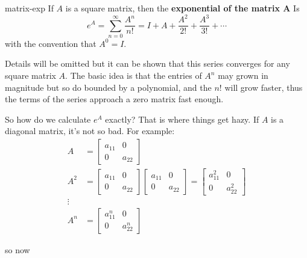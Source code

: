 \documentclass[letterpaper, 11pt, openany]{book}
\theoremstyle{mytheoremstyle}
\theoremstyle{myexamplestyle}
\begin{document}
\begin{definition}{}{matrix-exp}
    If \(A\) is a square matrix, then the \textbf{exponential of the matrix \(\bm{A}\)} Is
    \[e^{A} = \sum_{n=0}^{\infty} \frac{A^{n}}{n!} = I + A + \frac{A^{2}}{2!} + \frac{A^{3}}{3!} + \cdots\]
    with the convention that \(A^{0} = I\).
\end{definition}
Details will be omitted but it can be shown that this series converges for any square matrix \(A\). The basic idea is that the entries of \(A^{n}\) may grown in magnitude but so do bounded by a polynomial, and the \(n!\) will grow faster, thus the terms of the series approach a zero matrix fast enough.

So how do we calculate \(e^{A}\) exactly? That is where things get hazy. If \(A\) is a diagonal matrix, it's not so bad. For example:
\begin{align*}
    A &= \begin{bmatrix}
        a_{11} & 0\\
        0 & a_{22}
    \end{bmatrix} \\
    A^{2} &= \begin{bmatrix}
        a_{11} & 0\\
        0 & a_{22}
    \end{bmatrix}\begin{bmatrix}
        a_{11} & 0\\
        0 & a_{22}
    \end{bmatrix} =
    \begin{bmatrix}
        a_{11}^{2} & 0\\
        0 & a_{22}^{2}
    \end{bmatrix}\\
    \vdots\\
    A^{n} &= \begin{bmatrix}
        a_{11}^{n} & 0\\
        0 & a_{22}^{n}
    \end{bmatrix}
\end{align*}

so now
\end{document}
